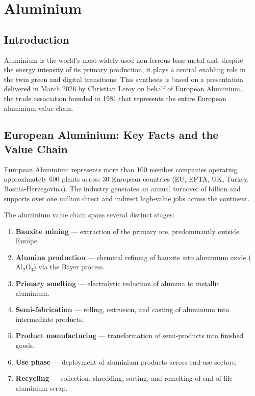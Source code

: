 \chapter{Aluminium}

\section{Introduction}

Aluminium is the world's most widely used non-ferrous base metal and, despite the energy intensity
of its primary production, it plays a central enabling role in the twin green and digital transitions.
This synthesis is based on a presentation delivered in March 2026 by Christian Leroy on behalf of
European Aluminium, the trade association founded in 1981 that represents the entire European
aluminium value chain.

\section{European Aluminium: Key Facts and the Value Chain}

European Aluminium represents more than 100 member companies operating approximately 600
plants across 30 European countries (EU, EFTA, UK, Turkey, Bosnia-Herzegovina). The industry
generates an annual turnover of  billion and supports over one million direct and indirect
high-value jobs across the continent.

The aluminium value chain spans several distinct stages:

\begin{enumerate}[label=\arabic*.]
    \item \textbf{Bauxite mining} — extraction of the primary ore, predominantly outside Europe.
    \item \textbf{Alumina production} — chemical refining of bauxite into aluminium oxide
          ($\text{Al}_2\text{O}_3$) via the Bayer process.
    \item \textbf{Primary smelting} — electrolytic reduction of alumina to metallic aluminium.
    \item \textbf{Semi-fabrication} — rolling, extrusion, and casting of aluminium into
          intermediate products.
    \item \textbf{Product manufacturing} — transformation of semi-products into finished goods.
    \item \textbf{Use phase} — deployment of aluminium products across end-use sectors.
    \item \textbf{Recycling} — collection, shredding, sorting, and remelting of end-of-life
          aluminium scrap.
\end{enumerate}

